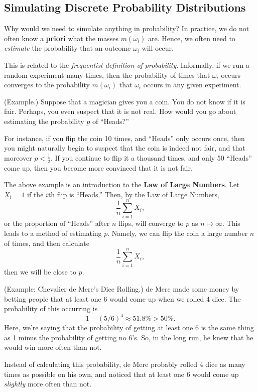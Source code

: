 \documentclass[letterpaper]{article}
\begin{document}
\subsection{Simulating Discrete Probability Distributions}
Why would we need to simulate anything in probability? In practice, we do not often know a \textbf{priori} what the masses $m(\omega_i)$ are. Hence, we often need to \emph{estimate} the probability that an outcome $\omega_i$ will occur.

\bigskip 

This is related to the \emph{frequentist definition of probability}. Informally, if we run a random experiment many times, then the probability of times that $\omega_i$ occurs converges to the probability $m(\omega_i)$ that $\omega_i$ occurs in any given experiment.

\begin{mdframed}[]
    (Example.) Suppose that a magician gives you a coin. You do not know if it is fair. Perhaps, you even suspect that it is not real. How would you go about estimating the probability $p$ of ``Heads?''

    \bigskip 

    For instance, if you flip the coin 10 times, and ``Heads'' only occurs once, then you might naturally begin to suspect that the coin is indeed not fair, and that moreover $p < \frac{1}{2}$. If you continue to flip it a thousand times, and only 50 ``Heads'' come up, then you become more convinced that it is not fair. 
\end{mdframed}

The above example is an introduction to the \textbf{Law of Large Numbers}. Let $X_i = 1$ if the $i$th flip is ``Heads.'' Then, by the Law of Large Numbers, 
\[\frac{1}{n} \sum_{i = 1}^n X_i,\]
or the proportion of ``Heads'' after $n$ flips, will converge to $p$ as $n \mapsto \infty$. This leads to a method of estimating $p$. Namely, we can flip the coin a large number $n$ of times, and then calculate 
\[\frac{1}{n} \sum_{i = 1}^n X_i,\]
then we will be close to $p$.

\begin{mdframed}[]
    (Example: Chevalier de Mere's Dice Rolling.) de Mere made some money by betting people that at least one 6 would come up when we rolled 4 dice. The probability of this occurring is 
    \[1 - (5 / 6)^4 \approx 51.8\% > 50\%.\]
    Here, we're saying that the probability of getting at least one 6 is the same thing as 1 minus the probability of getting no 6's. So, in the long run, he knew that he would win more often than not. 

    \bigskip 

    Instead of calculating this probability, de Mere probably rolled 4 dice as many times as possible on his own, and noticed that at least one 6 would come up \emph{slightly} more often than not.
\end{mdframed}
\end{document}
